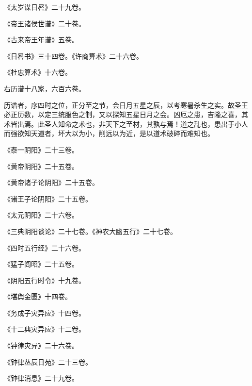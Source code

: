 \documentclass[12pt,UTF8]{ctexbook}
\begin{document}
《太岁谋日晷》二十九卷。



《帝王诸侯世谱》二十卷。



《古来帝王年谱》五卷。



《日晷书》三十四卷。《许商算术》二十六卷。



《杜忠算术》十六卷。



右历谱十八家，六百六卷。



历谱者，序四时之位，正分至之节，会日月五星之辰，以考寒暑杀生之实。故圣王必正历数，以定三统服色之制，又以探知五星日月之会。凶厄之患，吉隆之喜，其术皆出焉。此圣人知命之术也，非天下之至材，其孰与焉！道之乱也，患出于小人而强欲知天道者，坏大以为小，削远以为近，是以道术破碎而难知也。



《泰一阴阳》二十三卷。



《黄帝阴阳》二十五卷。



《黄帝诸子论阴阳》二十五卷。



《诸王子论阴阳》二十五卷。



《太元阴阳》二十六卷。



《三典阴阳谈论》二十七卷。《神农大幽五行》二十七卷。



《四时五行经》二十六卷。



《猛子闾昭》二十五卷。



《阴阳五行时令》十九卷。



《堪舆金匮》十四卷。



《务成子灾异应》十四卷。



《十二典灾异应》十二卷。



《钟律灾异》二十六卷。



《钟律丛辰日苑》二十三卷。



《钟律消息》二十九卷。
\end{document}
